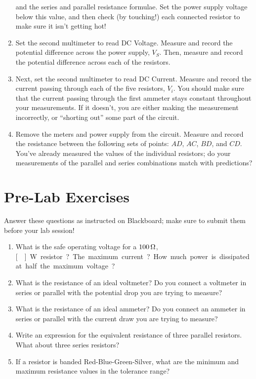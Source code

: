 \documentclass[12pt]{article}
\begin{document}
\begin{enumerate}
  and the series and parallel resistance formulae.  Set the power
  supply voltage below this value, and then check (by touching!) each
  connected resistor to make sure it isn't getting hot!
\item Set the second multimeter to read DC Voltage.  Measure and
  record the potential difference across the power supply, $V_S$.  Then,
  measure and record the potential difference across each of the
  resistors.
\item Next, set the second multimeter to read DC Current.  Measure and
  record the current passing through each of the five resistors,
  $V_i$.  You should make sure that the current passing through the
  first ammeter stays constant throughout your measurements.  If it
  doesn't, you are either making the measurement incorrectly, or
  ``shorting out'' some part of the circuit.
\item Remove the meters and power supply from the circuit.  Measure
  and record the resistance between the following sets of points:
  $AD$, $AC$, $BD$, and $CD$.  You've already measured the values of
  the individual resistors; do your measurements of the parallel and
  series combinations match with predictions?
\end{enumerate}

\newpage

\section*{Pre-Lab Exercises}

Answer these questions as instructed on Blackboard; make sure to
submit them before your lab session!

\begin{enumerate}
\item What is the safe operating voltage for a $\unit[100]{\Omega}$,
  \unit[]{W} resistor?  The maximum current?  How much
  power is dissipated at half the maximum voltage?
\item What is the resistance of an ideal voltmeter?  Do you connect a
  voltmeter in series or parallel with the potential drop you are
  trying to measure?
\item What is the resistance of an ideal ammeter?  Do you connect an
  ammeter in series or parallel with the current draw you are trying
  to measure?
\item Write an expression for the equivalent resistance of three
  parallel resistors.  What about three series resistors?
\item If a resistor is banded Red-Blue-Green-Silver, what are the
  minimum and maximum resistance values in the tolerance range?
\end{enumerate}
\end{document}
